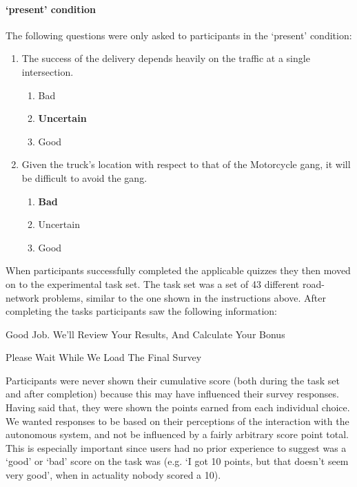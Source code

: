 \paragraph{\xO{} `present' condition} The following questions were only asked to participants in the \xO{} `present' condition:
\begin{quoting}
\begin{enumerate}
    \item The success of the delivery depends heavily on the traffic at a single intersection.
    \begin{enumerate}[label=(\alph*)]
        \item Bad
        \item \textbf{Uncertain}
        \item Good
    \end{enumerate}
    \item Given the truck’s location with respect to that of the Motorcycle gang, it will be difficult to avoid the gang.
    \begin{enumerate}[label=(\alph*)]
        \item \textbf{Bad}
        \item Uncertain
        \item Good
    \end{enumerate}
\end{enumerate}
\end{quoting}

When participants successfully completed the applicable quizzes they then moved on to the experimental task set. The task set was a set of 43 different road-network problems, similar to the one shown in the instructions above. After completing the tasks participants saw the following information:

\begin{quoting}
    Good Job. We'll Review Your Results, And Calculate Your Bonus

    Please Wait While We Load The Final Survey
\end{quoting}

Participants were never shown their cumulative score (both during the task set and after completion) because this may have influenced their survey responses. Having said that, they were shown the points earned from each individual choice. We wanted responses to be based on their perceptions of the interaction with the autonomous system, and not be influenced by a fairly arbitrary score point total. This is especially important since users had no prior experience to suggest was a `good' or `bad' score on the task was (e.g. `I got 10 points, but that doesn't seem very good', when in actuality nobody scored a 10).

